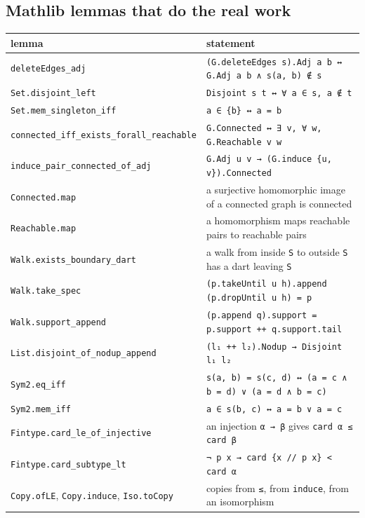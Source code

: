 \documentclass[11pt,a4paper]{article}
\newcommand{\lean}[1]{\texttt{\textcolor{leanink}{#1}}}
\begin{document}
\subsection*{Mathlib lemmas that do the real work}
\begin{center}\small
\begin{tabularx}{\linewidth}{@{}lL@{}}
\toprule
lemma & statement\\
\midrule
\lean{deleteEdges\_\allowbreak{}adj} & \lean{(G.deleteEdges s).Adj a b ↔ G.Adj a b ∧ s(a, b) ∉ s}\\
\lean{Set.disjoint\_\allowbreak{}left} & \lean{Disjoint s t ↔ ∀ a ∈ s, a ∉ t}\\
\lean{Set.mem\_\allowbreak{}singleton\_\allowbreak{}iff} & \lean{a ∈ \{b\} ↔ a = b}\\
\lean{connected\_\allowbreak{}iff\_\allowbreak{}exists\_\allowbreak{}forall\_\allowbreak{}reachable} & \lean{G.Connected ↔ ∃ v, ∀ w, G.Reachable v w}\\
\lean{induce\_\allowbreak{}pair\_\allowbreak{}connected\_\allowbreak{}of\_\allowbreak{}adj} & \lean{G.Adj u v → (G.induce \{u, v\}).Connected}\\
\lean{Connected.map} & a surjective homomorphic image of a connected graph is connected\\
\lean{Reachable.map} & a homomorphism maps reachable pairs to reachable pairs\\
\lean{Walk.exists\_\allowbreak{}boundary\_\allowbreak{}dart} & a walk from inside \lean{S} to outside \lean{S} has a dart leaving \lean{S}\\
\lean{Walk.take\_\allowbreak{}spec} & \lean{(p.takeUntil u h).append (p.dropUntil u h) = p}\\
\lean{Walk.support\_\allowbreak{}append} & \lean{(p.append q).support = p.support ++ q.support.tail}\\
\lean{List.disjoint\_\allowbreak{}of\_\allowbreak{}nodup\_\allowbreak{}append} & \lean{(l₁ ++ l₂).Nodup → Disjoint l₁ l₂}\\
\lean{Sym2.eq\_\allowbreak{}iff} & \lean{s(a, b) = s(c, d) ↔ (a = c ∧ b = d) ∨ (a = d ∧ b = c)}\\
\lean{Sym2.mem\_\allowbreak{}iff} & \lean{a ∈ s(b, c) ↔ a = b ∨ a = c}\\
\lean{Fintype.card\_\allowbreak{}le\_\allowbreak{}of\_\allowbreak{}injective} & an injection \lean{α → β} gives \lean{card α ≤ card β}\\
\lean{Fintype.card\_\allowbreak{}subtype\_\allowbreak{}lt} & \lean{¬ p x → card \{x // p x\} < card α}\\
\lean{Copy.ofLE}, \lean{Copy.induce}, \lean{Iso.toCopy} & copies from \lean{≤}, from \lean{induce}, from an isomorphism\\
\bottomrule
\end{tabularx}
\end{center}
\end{document}
